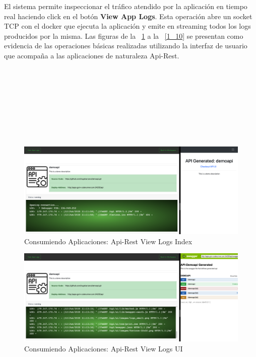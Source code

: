 \documentclass[a4paper,11pt]{book}
\begin{document}
El sistema permite inspeccionar el tráfico atendido por la aplicación en tiempo real haciendo click en el botón \textbf{View App Logs}. Esta operación abre un socket TCP con el docker que ejecuta la aplicación y emite en streaming todos los logs producidos por la misma. Las  figuras de la ~\ref{1_7} a la ~\ref{1_10}  se presentan  como evidencia de las operaciones básicas realizadas utilizando la interfaz de usuario que acompaña a las aplicaciones de naturaleza Api-Rest. 
~\\
~\\
~\\
~\\
~\\
~\\
~\\
~\\
~\\
\begin{figure}[H]
\centering
\includegraphics[scale=0.25]{imagenes/casouso_a/1_7.png}
\caption{  Consumiendo Aplicaciones: Api-Rest View Logs Index}
\label{1_7}
\end{figure}


\begin{figure}[H]
\centering
\includegraphics[scale=0.25]{imagenes/casouso_a/1_8.png}
\caption{  Consumiendo Aplicaciones: Api-Rest View Logs UI}
\label{1_8}
\end{figure}
\end{document}
